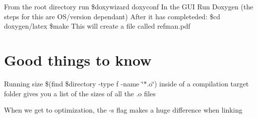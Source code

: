From the root directory run {\ttfamily \$doxywizard doxyconf} In the G\+UI Run Doxygen (the steps for this are O\+S/version dependant) After it has completeded\+: {\ttfamily \$cd doxygen/latex} {\ttfamily \$make} This will create a file called refman.\+pdf

\section*{Good things to know}

Running {\ttfamily size \$(find \$directory -\/type f -\/name \char`\"{}$\ast$.\+o\char`\"{})} inside of a compilation target folder gives you a list of the sizes of all the .o files

When we get to optimization, the -\/s flag makes a huge difference when linking 